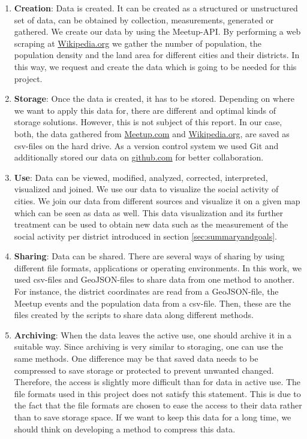 \begin{enumerate}
	\item \textbf{Creation}: Data is created. It can be created as a structured or unstructured set of data, can be obtained by collection, measurements, generated or gathered. We create our data by using the Meetup-API. By performing a web scraping at \url{Wikipedia.org} we gather the number of population, the population density and the land area for different cities and their districts. In this way, we request and create the data which is going to be needed for this project.
	\item \textbf{Storage}: Once the data is created, it has to be stored. Depending on where we want to apply this data for, there are different and optimal kinds of storage solutions. However, this is not subject of this report. In our case, both, the data gathered from \url{Meetup.com} and \url{Wikipedia.org}, are saved as csv-files on the hard drive. As a version control system we used Git and additionally stored our data on \url{github.com} for better collaboration.
	\item \textbf{Use}: Data can be viewed, modified, analyzed, corrected, interpreted, visualized and joined. We use our data to visualize the social activity of cities. We join our data from different sources and visualize it on a given map which can be seen as data as well. This data visualization and its further treatment can be used to obtain new data such as the measurement of the social activity per district introduced in section \ref{sec:summaryandgoals}.
	\item \textbf{Sharing}: Data can be shared. There are several ways of sharing by using different file formats, applications or operating environments. In this work, we used csv-files and GeoJSON-files to share data from one method to another. For instance, the district coordinates are read from a GeoJSON-file, the Meetup events and the population data from a csv-file. Then, these are the files created by the scripts to share data along different methods.
	\item \textbf{Archiving}: When the data leaves the active use, one should archive it in a suitable way. Since archiving is very similar to storaging, one can use the same methods. One difference may be that saved data needs to be compressed to save storage or protected to prevent unwanted changed. Therefore, the access is slightly more difficult than for data in active use. The file formats used in this project does not satisfy this statement. This is due to the fact that the file formats are chosen to ease the access to their data rather than to save storage space. If we want to keep this data for a long time, we should think on developing a method to compress this data.

\end{enumerate}
